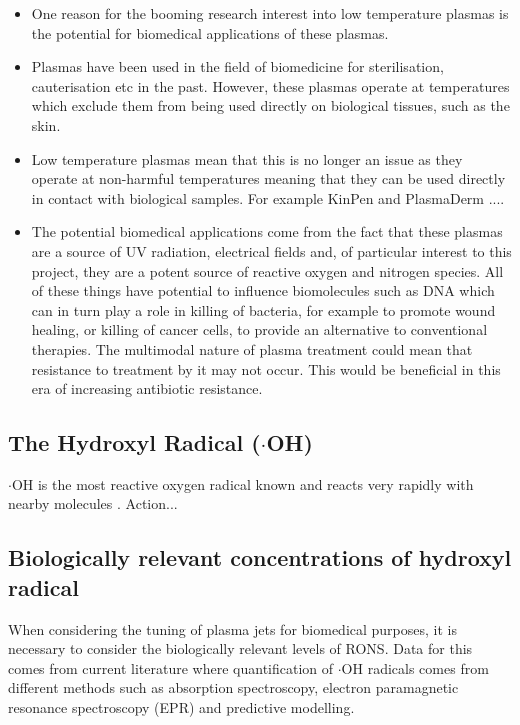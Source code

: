 \documentclass[11pt, oneside]{article}   	%
\begin{document}
\begin{itemize}

\item One reason for the booming research interest into low temperature plasmas is the potential for biomedical applications of these plasmas.
\item Plasmas have been used in the field of biomedicine for sterilisation, cauterisation etc in the past. However, these plasmas operate at temperatures which exclude them from being used directly on biological tissues, such as the skin.
\item Low temperature plasmas mean that this is no longer an issue as they operate at non-harmful temperatures meaning that they can be used directly in contact with biological samples. 
For example KinPen and PlasmaDerm \cite{BrehmerHD2015}....

\item The potential biomedical applications come from the fact that these plasmas are a source of UV radiation, electrical fields and, of particular interest to this project, they are a potent source of reactive oxygen and nitrogen species. All of these things have potential to influence biomolecules such as DNA which can in turn play a role in killing of bacteria, for example to promote wound healing, or killing of cancer cells, to provide an alternative to conventional therapies. 
The multimodal nature of plasma treatment could mean that resistance to treatment by it may not occur. 
This would be beneficial in this era of increasing antibiotic resistance.

\end{itemize}

\subsection{The Hydroxyl Radical ($\cdot$OH)}

$\cdot$OH is the most reactive oxygen radical known and reacts very rapidly with nearby molecules \cite{Halliwell2007}. 
Action...

\subsection{Biologically relevant concentrations of hydroxyl radical}

When considering the tuning of plasma jets for biomedical purposes, it is necessary to consider the biologically relevant levels of RONS.
Data for this comes from current literature where quantification of $\cdot$OH radicals comes from different methods such as absorption spectroscopy, electron paramagnetic resonance spectroscopy (EPR) and predictive modelling.
\end{document}
